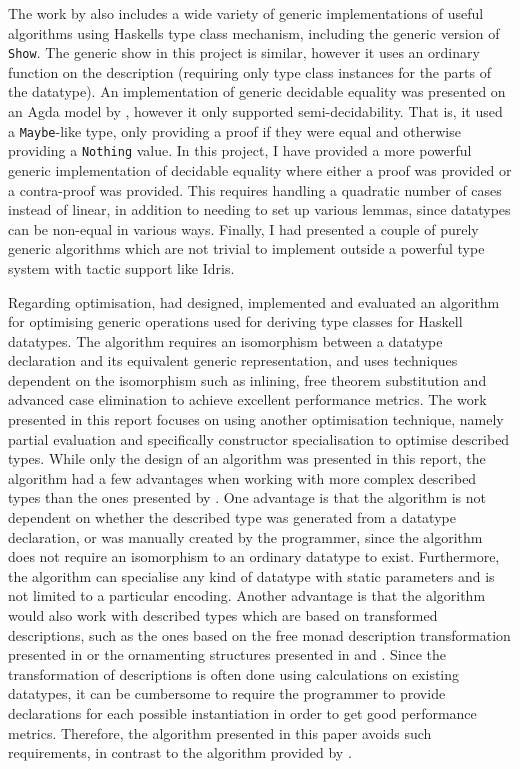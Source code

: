 \documentclass{ituthesis}
\newcommand{\ttconstructor}[1]{\textcolor{constructor-color}{\texttt{#1}}}
\newcommand{\tttype}[1]{\textcolor{type-color}{\texttt{#1}}}
\theoremstyle{break}
\begin{document}
The work by \citeauthor{magalhaes2012less} also includes a wide variety of generic implementations of useful algorithms using Haskells type class mechanism, including the generic version of \tttype{Show}.
The generic show in this project is similar, however it uses an ordinary function on the description (requiring only type class instances for the parts of the datatype).
An implementation of generic decidable equality was presented on an Agda model by \citeauthor{magalhaes2012less}, however it only supported semi-decidability.
That is, it used a \tttype{Maybe}-like type, only providing a proof if they were equal and otherwise providing a \ttconstructor{Nothing} value.
In this project, I have provided a more powerful generic implementation of decidable equality where either a proof was provided or a contra-proof was provided.
This requires handling a quadratic number of cases instead of linear, in addition to needing to set up various lemmas, since datatypes can be non-equal in various ways.
Finally, I had presented a couple of purely generic algorithms which are not trivial to implement outside a powerful type system with tactic support like Idris.

Regarding optimisation, \citeauthor{magalhaes2012less} had designed, implemented and evaluated an algorithm for optimising generic operations used for deriving type classes for Haskell datatypes.
The algorithm requires an isomorphism between a datatype declaration and its equivalent generic representation, and uses techniques dependent on the isomorphism such as inlining, free theorem substitution and advanced case elimination to achieve excellent performance metrics.
The work presented in this report focuses on using another optimisation technique, namely partial evaluation and specifically constructor specialisation to optimise described types.
While only the design of an algorithm was presented in this report, the algorithm had a few advantages when working with more complex described types than the ones presented by \citeauthor{magalhaes2012less}.
One advantage is that the algorithm is not dependent on whether the described type was generated from a datatype declaration, or was manually created by the programmer, since the algorithm does not require an isomorphism to an ordinary datatype to exist.
Furthermore, the algorithm can specialise any kind of datatype with static parameters and is not limited to a particular encoding.
Another advantage is that the algorithm would also work with described types which are based on transformed descriptions, such as the ones based on the free monad description transformation presented in \textcite{Chapman:2010:GAL:1863543.1863547} or the ornamenting structures presented in \textcite{mcbride2010ornamental} and \textcite{dagand2012transporting}.
Since the transformation of descriptions is often done using calculations on existing datatypes, it can be cumbersome to require the programmer to provide declarations for each possible instantiation in order to get good performance metrics.
Therefore, the algorithm presented in this paper avoids such requirements, in contrast to the algorithm provided by \citeauthor{magalhaes2012less}.
\end{document}
